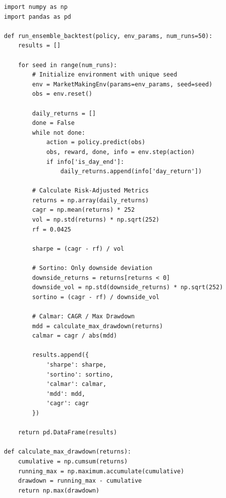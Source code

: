 \begin{lstlisting}[style=pythonstyle, caption={Ensemble performance evaluation and metric distribution}, label={lst:ensemble_eval}]
import numpy as np
import pandas as pd

def run_ensemble_backtest(policy, env_params, num_runs=50):
    results = []
    
    for seed in range(num_runs):
        # Initialize environment with unique seed
        env = MarketMakingEnv(params=env_params, seed=seed)
        obs = env.reset()
        
        daily_returns = []
        done = False
        while not done:
            action = policy.predict(obs)
            obs, reward, done, info = env.step(action)
            if info['is_day_end']:
                daily_returns.append(info['day_return'])
        
        # Calculate Risk-Adjusted Metrics
        returns = np.array(daily_returns)
        cagr = np.mean(returns) * 252
        vol = np.std(returns) * np.sqrt(252)
        rf = 0.0425
        
        sharpe = (cagr - rf) / vol
        
        # Sortino: Only downside deviation
        downside_returns = returns[returns < 0]
        downside_vol = np.std(downside_returns) * np.sqrt(252)
        sortino = (cagr - rf) / downside_vol
        
        # Calmar: CAGR / Max Drawdown
        mdd = calculate_max_drawdown(returns)
        calmar = cagr / abs(mdd)
        
        results.append({
            'sharpe': sharpe,
            'sortino': sortino,
            'calmar': calmar,
            'mdd': mdd,
            'cagr': cagr
        })
        
    return pd.DataFrame(results)

def calculate_max_drawdown(returns):
    cumulative = np.cumsum(returns)
    running_max = np.maximum.accumulate(cumulative)
    drawdown = running_max - cumulative
    return np.max(drawdown)
\end{lstlisting}
